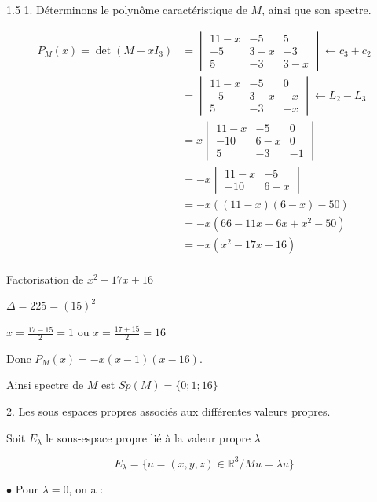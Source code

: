 \documentclass[12pt]{article}
\begin{document}
\begin{spacing}{1.5}
1. Déterminons le polynôme caractéristique de $M$, ainsi que son spectre.

\begin{align*}
P_M(x)=\det(M-xI_3)&=\begin{vmatrix}
11-x & -5 & 5 \\ 
-5 & 3-x & -3 \\ 
5 & -3 & 3-x
\end{vmatrix}\leftarrow c_3+c_2\\
&=\begin{vmatrix}
11-x & -5 & 0 \\ 
-5 & 3-x & -x \\ 
5 & -3 & -x
\end{vmatrix}\leftarrow L_2-L_3\\
&=x\begin{vmatrix}
11-x & -5 & 0 \\ 
-10 & 6-x & 0 \\ 
5 & -3 & -1
\end{vmatrix}\\
&=-x\begin{vmatrix}
11-x & -5 \\
-10 & 6-x 
\end{vmatrix}\\
&=-x((11-x)(6-x)-50)\\
&=-x(66-11x-6x+x^2-50)\\
&=-x(x^2-17x+16)\\
\end{align*}

Factorisation de $x^2-17x+16$

$\Delta=225=(15)^2$

$x=\frac{17-15}{2}=1$ ou $x=\frac{17+15}{2}=16$

Donc $P_M(x)=-x(x-1)(x-16)$.

Ainsi spectre de $M$ est $Sp(M)=\{0;1;16\}$

2. Les sous espaces propres associés aux différentes valeurs propres.

Soit $E_\lambda$ le sous-espace propre lié à la valeur propre $\lambda$

\[
E_\lambda=\{u=(x,y,z)\in \mathbb{R}^3/Mu=\lambda u\}
\]

\medskip
$\bullet$ Pour $\lambda=0$, on a :


\end{spacing}
\end{document}
